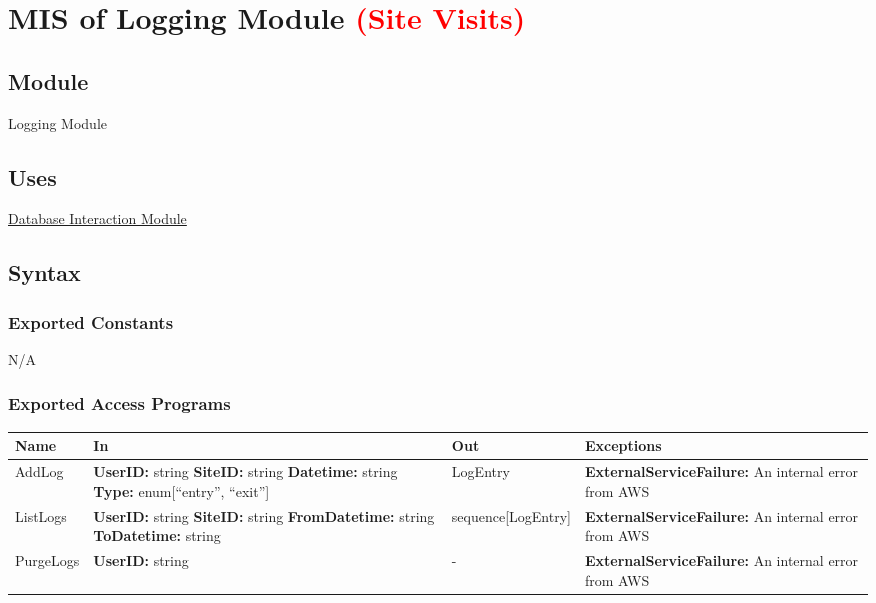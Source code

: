 \documentclass[12pt, titlepage]{article}
\begin{document}
\section{MIS of Logging Module \textcolor{red}{(Site Visits)}}
\label{sec:LM}

\subsection{Module}

Logging Module

\subsection{Uses}

\hyperref[sec:DI]{Database Interaction Module}

\subsection{Syntax}

\subsubsection{Exported Constants}

N/A

\subsubsection{Exported Access Programs}

\begin{center}
  \begin{tabular}{>{\raggedright}p{3cm} >{\raggedright}p{5cm}
    >{\raggedright}p{4cm} p{4cm}}
    \hline
    \textbf{Name} & \textbf{In} & \textbf{Out} & \textbf{Exceptions} \\
    \hline
    AddLog & \textbf{UserID:} string \newline \textbf{SiteID:} string
    \newline \textbf{Datetime:} string \newline \textbf{Type:}
    enum[``entry'', ``exit''] & LogEntry &
    \textbf{ExternalServiceFailure:} An internal error from AWS \\
    \hline
    ListLogs & \textbf{UserID:} string \newline \textbf{SiteID:}
    string \newline \textbf{FromDatetime:} string \newline
    \textbf{ToDatetime:} string &
    sequence[LogEntry] & \textbf{ExternalServiceFailure:} An internal
    error from AWS \\
    \hline
    PurgeLogs & \textbf{UserID:} string & - &
    \textbf{ExternalServiceFailure:} An internal error from AWS \\
    \hline
  \end{tabular}
\end{center}
\end{document}
